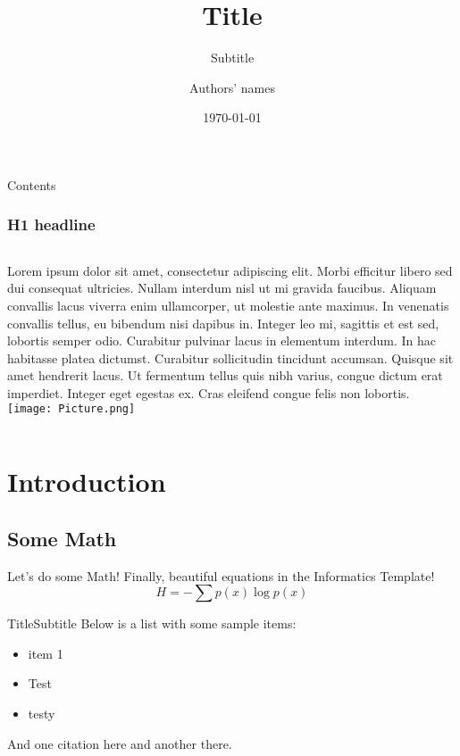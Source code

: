 \documentclass[aspectratio=169]{beamer}
\title[Short Title]{Title}
\subtitle{Subtitle}
\author{Authors' names}
\date{\today}
\institute{Institute}
\begin{document}
\begin{frame}
  \maketitle
\end{frame}

\begin{frame}{Contents}
  \tableofcontents
\end{frame}

\begin{frame}
  \frametitle{H1 headline}
  \begin{columns}
      \footnotesize
      Lorem ipsum dolor sit amet, consectetur adipiscing elit. Morbi efficitur libero sed dui consequat ultricies. Nullam interdum nisl ut mi gravida faucibus. Aliquam convallis lacus viverra enim ullamcorper, ut molestie ante maximus. In venenatis convallis tellus, eu bibendum nisi dapibus in. Integer leo mi, sagittis et est sed, lobortis semper odio. Curabitur pulvinar lacus in elementum interdum. In hac habitasse platea dictumst. Curabitur sollicitudin tincidunt accumsan. Quisque sit amet hendrerit lacus.  Ut fermentum tellus quis nibh varius, congue dictum erat imperdiet. Integer eget egestas ex. Cras eleifend congue felis non lobortis.
    \texttt{[image: Picture.png]}
  \end{columns}
\end{frame}

\section{Introduction}

\subsection{Some Math}

\begin{frame}{Let's do some Math!}
  Finally, beautiful equations in the Informatics Template!
  \begin{equation}
    H = -\sum p(x)\log p(x)
  \end{equation}
\end{frame}

\begin{frame}{Title}{Subtitle}
  Below is a list with some sample items:
  \begin{itemize}
    \item{item 1}
    \item{Test}
    \item{testy}
  \end{itemize}
  And one citation here and another there.
\end{frame}
\end{document}
